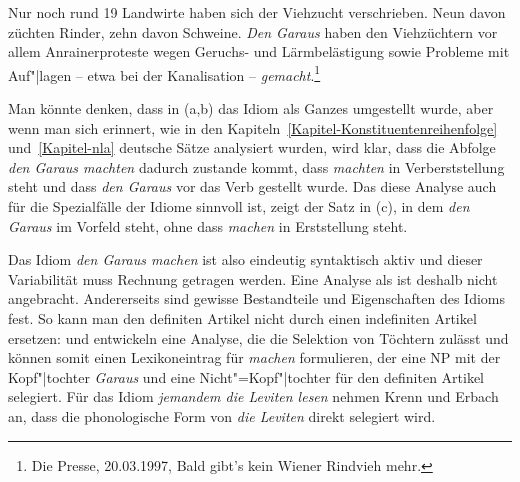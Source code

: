 \ex Nur noch rund 19 Landwirte haben sich der Viehzucht verschrieben. Neun davon züchten Rinder, zehn davon Schweine. 
\emph{Den Garaus} haben den Viehzüchtern vor allem Anrainerproteste wegen Geruchs- und Lärmbelästigung sowie Probleme mit Auf"|lagen -- etwa bei der Kanalisation -- \emph{gemacht}.\footnote{
Die Presse, 20.03.1997, Bald gibt's kein Wiener Rindvieh mehr. %
}



\zl
Man könnte denken, dass in (a,b) das Idiom als Ganzes umgestellt wurde, aber wenn man sich
erinnert, wie in den Kapiteln~\ref{Kapitel-Konstituentenreihenfolge} und~\ref{Kapitel-nla} deutsche Sätze
analysiert wurden, wird klar, dass die Abfolge \emph{den Garaus machten} dadurch zustande kommt, dass
\emph{machten} in Verberststellung steht und dass \emph{den Garaus} vor das Verb gestellt wurde. Das diese
Analyse auch für die Spezialfälle der Idiome sinnvoll ist, zeigt der Satz in (c), in dem
\emph{den Garaus} im Vorfeld steht, ohne dass \emph{machen} in Erststellung steht.

Das Idiom \emph{den Garaus machen} ist also eindeutig syntaktisch aktiv und dieser Variabilität muss
Rechnung getragen werden. Eine Analyse als \vnull ist deshalb nicht angebracht. Andererseits
sind gewisse Bestandteile und Eigenschaften des Idioms fest. So kann man \zb den definiten Artikel nicht durch einen
indefiniten Artikel ersetzen:
\z
\citet{Erbach92a} und \citet{KE94a} entwickeln eine Analyse, die die Selektion von Töchtern zulässt und können
somit einen Lexikoneintrag für \emph{machen} formulieren, der eine NP mit der Kopf"|tochter \emph{Garaus}
und eine Nicht"=Kopf"|tochter für den definiten Artikel selegiert. Für das Idiom \emph{jemandem die Leviten
lesen} nehmen Krenn und Erbach an, dass die phonologische Form von \emph{die Leviten} direkt selegiert
wird.

